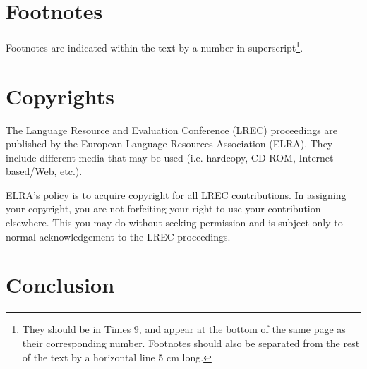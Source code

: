 \documentclass[10pt, a4paper]{article}
\begin{document}
%
%
%
%
%

\section{Footnotes}

Footnotes are indicated within the text by a number in superscript\footnote{They should be in Times 9, and appear at the bottom of the same page as their corresponding number. Footnotes should also be separated from the rest of the text by a horizontal line 5 cm long.}.

\section{Copyrights}

The Lan\-gua\-ge Re\-sour\-ce and Evalua\-tion Con\-fe\-rence (LREC) proceedings are published by the European Language Resources Association (ELRA). They include different media that may be used (i.e. hardcopy, CD-ROM, Internet-based/Web, etc.).

ELRA's policy is to acquire copyright for all LREC contributions. In assigning your copyright, you are not forfeiting your right to use your contribution elsewhere. This you may do without seeking permission and is subject only to normal acknowledgement to the LREC proceedings.

\section{Conclusion}
\end{document}
